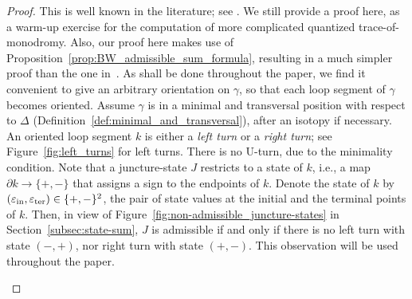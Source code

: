 \documentclass[10pt,a4paper]{amsart}
\numberwithin{equation}{section}
\theoremstyle{definition}
\begin{document}
\begin{proof} This is well known in the literature; see \cite[Lemma~3.24]{AK}. We still provide a proof here, as a warm-up exercise for the computation of more complicated quantized trace-of-monodromy. Also, our proof here makes use of Proposition~\ref{prop:BW_admissible_sum_formula}, resulting in a much simpler proof than the one in~\cite{AK}.
As shall be done throughout the paper, we find it convenient to give an arbitrary orientation on $\gamma$, so that each loop segment of $\gamma$ becomes oriented. Assume $\gamma$ is in a minimal and transversal position with respect to $\Delta$ (Definition~\ref{def:minimal_and_transversal}), after an isotopy if necessary. An oriented loop segment $k$ is either a {\em left turn} or a {\em right turn}; see Figure~\ref{fig:left_turns} for left turns. There is no U\nobreakdash-turn, due to the minimality condition. Note that a juncture-state $J$ restricts to a state of $k$, i.e., a map $\partial k \to \{+,-\}$ that assigns a sign to the endpoints of $k$. Denote the state of $k$ by $(\varepsilon_{\rm in}, \varepsilon_{\rm ter}) \in \{+,-\}^2$, the pair of state values at the initial and the terminal points of $k$. Then, in view of Figure~\ref{fig:non-admissible_juncture-states} in Section~\ref{subsec:state-sum}, $J$ is admissible if and only if there is no left turn with state $(-,+)$, nor right turn with state $(+,-)$. This observation will be used throughout the paper.
\begin{figure}
\centering\hspace*{-15mm}
\begin{subfigure}[b]{0.33\textwidth}\centering
 \scalebox{0.7}{%
}
\end{subfigure}
\end{figure}
\end{proof}
\end{document}
